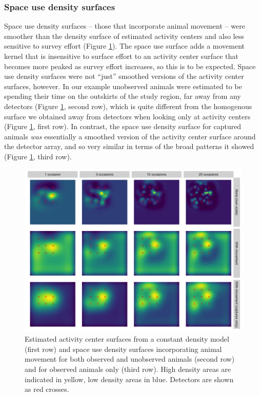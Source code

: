 \documentclass[a4paper,12pt]{article}
\begin{document}
\subsubsection{Space use density surfaces}

Space use density surfaces -- those that incorporate animal movement -- were smoother than the density surface of estimated activity centers and also less sensitive to survey effort (Figure \ref{move}). The space use surface adds a movement kernel that is insensitive to surface effort to an activity center surface that becomes more peaked as survey effort increases, so this is to be expected. Space use density surfaces were not ``just'' smoothed versions of the activity center surfaces, however. In our example unobserved animals were estimated to be spending their time on the outskirts of the study region, far away from any detectors (Figure \ref{move}, second row), which is quite different from the homogenous surface we obtained away from detectors when looking only at activity centers (Figure \ref{move}, first row). In contrast, the space use density surface for captured animals {\it was} essentially a smoothed version of the activity center surface around the detector array, and so very similar in terms of the broad patterns it showed (Figure \ref{move}, third row).

\begin{figure}[htbp]
\centering
\includegraphics[width=1\textwidth]{mona_with_movement}
\caption{Estimated activity center surfaces from a constant density model (first row) and space use density surfaces incorporating animal movement for both observed and unobserved animals (second row) and for observed animals only (third row). High density areas are indicated in yellow, low density areas in blue. Detectors are shown as red crosses.}
\label{move}
\end{figure}
\end{document}
